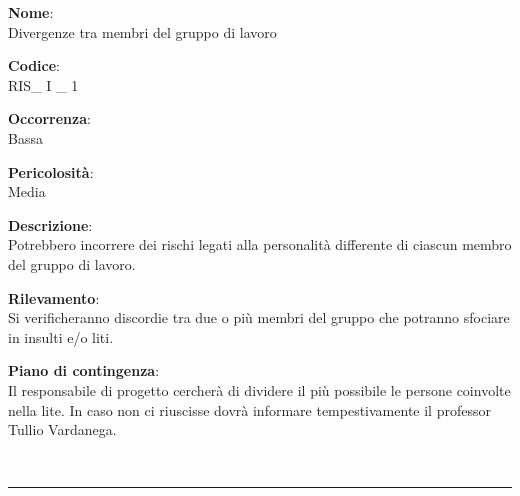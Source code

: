 {\setlength{\parindent}{0cm}
\begin{minipage}{\textwidth} 
\begin{multicols}{4}
\textbf{Nome}: \\ Divergenze tra membri del gruppo di lavoro \columnbreak

\textbf{Codice}: \\ RIS\_ I \_ 1 
\columnbreak

\textbf{Occorrenza}: \\ Bassa 
\columnbreak

\textbf{Pericolosità}: \\ Media

\end{multicols}

\begin{multicols}{3}

\textbf{Descrizione}: \\ Potrebbero incorrere dei rischi legati alla personalità differente di ciascun membro del gruppo di lavoro.
\columnbreak

\textbf{Rilevamento}: \\ Si verificheranno discordie tra due o più membri del gruppo che potranno sfociare in insulti e/o liti.
\columnbreak

\textbf{Piano di contingenza}: \\ Il responsabile di progetto cercherà di dividere il più possibile le persone coinvolte nella lite. In caso non ci riuscisse dovrà informare tempestivamente il professor Tullio Vardanega.\\

\columnbreak
\end{multicols}
\end{minipage}} \\

\noindent\rule{\textwidth}{1pt}\\

